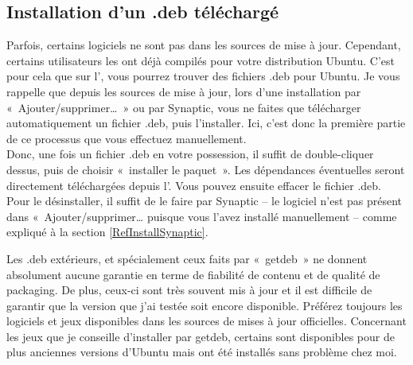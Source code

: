 \subsection{Installation d'un .deb téléchargé}
Parfois, certains logiciels ne sont pas dans les sources de mise à jour. Cependant, certains utilisateurs les ont déjà compilés pour votre distribution Ubuntu. C'est pour cela que sur l', vous pourrez trouver des fichiers .deb pour Ubuntu. Je vous rappelle que depuis les sources de mise à jour, lors d'une installation par «~Ajouter/supprimer\dots{}~» ou par Synaptic, vous ne faites que télécharger automatiquement un fichier .deb, puis l'installer. Ici, c'est donc la première partie de ce processus que vous effectuez manuellement.\\
Donc, une fois un fichier .deb en votre possession, il suffit de double-cliquer dessus, puis de choisir «~installer le paquet~». Les dépendances éventuelles seront directement téléchargées depuis l'. Vous pouvez ensuite effacer le fichier .deb.\\
Pour le désinstaller, il suffit de le faire par Synaptic -- le logiciel n'est pas présent dans «~Ajouter/supprimer\dots{} puisque vous l'avez installé manuellement -- comme expliqué à la section \ref{RefInstallSynaptic}.\par
\begin{attention}
Les .deb extérieurs, et spécialement ceux faits par «~getdeb~» ne donnent absolument aucune garantie en terme de fiabilité de contenu et de qualité de packaging. De plus, ceux-ci sont très souvent mis à jour et il est difficile de garantir que la version que j'ai testée soit encore disponible. Préférez toujours les logiciels et jeux disponibles dans les sources de mises à jour officielles. Concernant les jeux que je conseille d'installer par getdeb, certains sont disponibles pour de plus anciennes versions d'Ubuntu mais ont été installés sans problème chez moi.
\end{attention}
